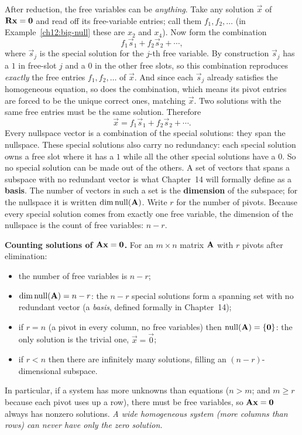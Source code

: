 After reduction, the free variables can be \emph{anything}. Take any solution
$\vec{x}$ of $\mathbf{R}\mathbf{x}=\mathbf{0}$ and read off its free-variable entries; call
them $f_1, f_2, \dots$ (in Example~\ref{ch12:big-null} these are $x_2$ and
$x_4$). Now form the combination
\[
  f_1\vec{s}_1 + f_2\vec{s}_2 + \cdots,
\]
where $\vec{s}_j$ is the special solution for the $j$-th free variable. By
construction $\vec{s}_j$ has a $1$ in free-slot $j$ and a $0$ in the other free
slots, so this combination reproduces \emph{exactly} the free entries
$f_1,f_2,\dots$ of $\vec{x}$. And since each $\vec{s}_j$ already satisfies the
homogeneous equation, so does the combination, which means its pivot entries are
forced to be the unique correct ones, matching $\vec{x}$. Two solutions with the
same free entries must be the same solution. Therefore
\[
  \vec{x} = f_1\vec{s}_1 + f_2\vec{s}_2 + \cdots.
\]
Every nullspace vector is a combination of the special solutions: they span the
nullspace. These special solutions also carry no redundancy:
each special solution owns a free slot where it has a $1$ while all the
other special solutions have a $0$. So no special
solution can be made out of the others. A set of vectors that spans a subspace
with no redundant vector is what Chapter~14 will formally define as a \textbf{basis}.
The number of vectors in such a set is the \textbf{dimension} of the subspace;
for the nullspace it is written $\dim\operatorname{null}(\mathbf{A})$. Write $r$ for the number of pivots. Because every special solution comes from exactly one
free variable, the dimension of the nullspace is the count of free variables: $n - r$.

\begin{formalbox}
\textbf{Counting solutions of $\mathbf{A}\mathbf{x}=\mathbf{0}$.} For an $m\times n$ matrix
$\mathbf{A}$ with $r$ pivots after elimination:
\begin{itemize}
  \item the number of free variables is $n - r$;
  \item $\dim\operatorname{null}(\mathbf{A}) = n - r$: the $n-r$ special solutions form a spanning set with no redundant vector (a \emph{basis}, defined formally in Chapter~14);
  \item if $r = n$ (a pivot in every column, no free variables) then
  $\operatorname{null}(\mathbf{A}) = \{\mathbf{0}\}$: the only solution is the trivial one, $\vec{x}=\vec{0}$;
  \item if $r < n$ then there are infinitely many solutions, filling an
  $(n-r)$-dimensional subspace.
\end{itemize}
In particular, if a system has more unknowns than equations ($n > m$; and
$m \ge r$ because each pivot uses up a row),
there must be free variables, so $\mathbf{A}\mathbf{x}=\mathbf{0}$ always has nonzero
solutions. \emph{A wide homogeneous system (more columns than rows) can never have only the zero
solution.}
\end{formalbox}

